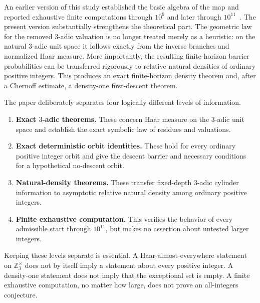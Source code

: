 \documentclass[11pt]{article}
\theoremstyle{definition}
\theoremstyle{remark}
\newcommand{\Zthree}{\mathbb Z_3}
\begin{document}
An earlier version of this study established the basic algebra of the map and reported exhaustive finite computations through $10^9$ and later through $10^{11}$~\cite{banazadeh2026base}.  The present version substantially strengthens the theoretical part.  The geometric law for the removed $3$-adic valuation is no longer treated merely as a heuristic: on the natural $3$-adic unit space it follows exactly from the inverse branches and normalized Haar measure.  More importantly, the resulting finite-horizon barrier probabilities can be transferred rigorously to relative natural densities of ordinary positive integers.  This produces an exact finite-horizon density theorem and, after a Chernoff estimate, a density-one first-descent theorem.

The paper deliberately separates four logically different levels of information.

\begin{enumerate}[leftmargin=2.2em]
\item \textbf{Exact $3$-adic theorems.}  These concern Haar measure on the $3$-adic unit space and establish the exact symbolic law of residues and valuations.
\item \textbf{Exact deterministic orbit identities.}  These hold for every ordinary positive integer orbit and give the descent barrier and necessary conditions for a hypothetical no-descent orbit.
\item \textbf{Natural-density theorems.}  These transfer fixed-depth $3$-adic cylinder information to asymptotic relative natural density among ordinary positive integers.
\item \textbf{Finite exhaustive computation.}  This verifies the behavior of every admissible start through $10^{11}$, but makes no assertion about untested larger integers.
\end{enumerate}

Keeping these levels separate is essential.  A Haar-almost-everywhere statement on $\Zthree^\times$ does not by itself imply a statement about every positive integer.  A density-one statement does not imply that the exceptional set is empty.  A finite exhaustive computation, no matter how large, does not prove an all-integers conjecture.
\end{document}
